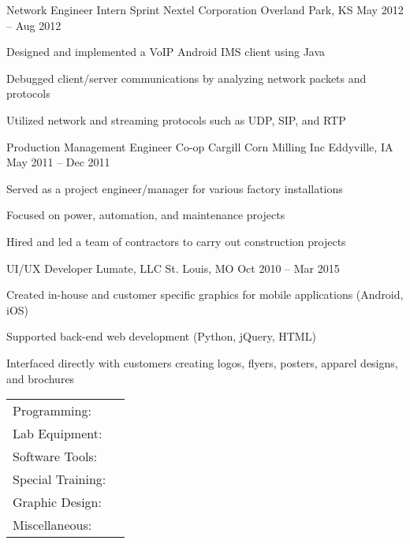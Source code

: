 \documentclass[]{awesome-cv}
\begin{document}
\begin{cventries}
{\begin{cvitems}
		\end{cvitems}}
	\cventry
	{Network Engineer Intern}
	{Sprint Nextel Corporation}
	{Overland Park, KS}
	{May 2012 – Aug 2012}
	{\begin{cvitems}
		\item {Designed and implemented a VoIP Android IMS client using Java}
		\item {Debugged client/server communications by analyzing network packets and protocols}
		\item {Utilized network and streaming protocols such as UDP, SIP, and RTP}
		\end{cvitems}}
	\cventry
	{Production Management Engineer Co-op}
	{Cargill Corn Milling Inc}
	{Eddyville, IA}
	{May 2011 – Dec 2011}
	{\begin{cvitems}
		\item {Served as a project engineer/manager for various factory installations}
		\item {Focused on power, automation, and maintenance projects}
		\item {Hired and led a team of contractors to carry out construction projects}
		\end{cvitems}}
	\cventry
	{UI/UX Developer}
	{Lumate, LLC}
	{St. Louis, MO}
	{Oct 2010 – Mar 2015}
	{\begin{cvitems}
		\item {Created in-house and customer specific graphics for mobile applications (Android, iOS)}
		\item {Supported back-end web development (Python, jQuery, HTML)}
		\item {Interfaced directly with customers creating logos, flyers, posters, apparel designs, and brochures}
		\end{cvitems}}
\end{cventries}
\vspace{40mm}
\begin{cventries}
	\cventry
	{}
	{\def\arraystretch{1.15}{\begin{tabular}{ l l}
		Programming:  & {\skill{ VB.NET, Python, Java, MATLAB, Arduino, Github, Subversion, TestStand, ADB, VISA, PowerShell}} \\
		Lab Equipment:  & {\skill{ Oscilloscopes, multimeters, network analyzers, power supplies, Raspberry Pi, Arduino, PXI}} \\
		Software Tools:  & {\skill{ Schematic capture, PCB layout, Mentor Graphics, CADSTAR, OrCad, SPICE, Solidworks}} \\
		Special Training:  & {\skill{ Advanced GNSS/GPS, Radar Systems Certificate, MIL-STD 1553}} \\
		Graphic Design:  & {\skill{ Adobe Photoshop, Adobe Illustrator, LaTeX, HTML, Bootstrap}} \\
		Miscellaneous:  & {\skill{ MS Office, Android, Linux, Windows, Atlassian suite}} \\
		\end{tabular}}}
	{}
	{}
	{}
\end{cventries}
\end{document}
